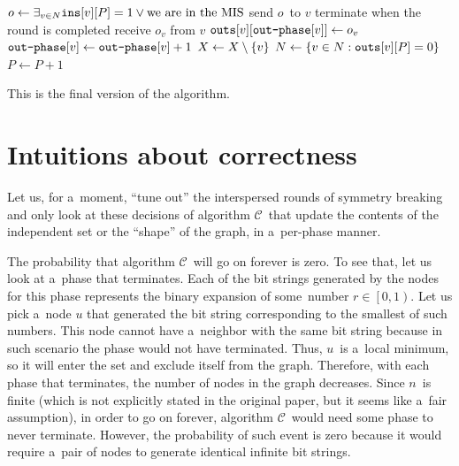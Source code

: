\documentclass{article}
\DeclarePairedDelimiter{\bracesdelimiter}{\{}{\}}
\def\braces{\bracesdelimiter*}
\let\set\braces
\DeclarePairedDelimiter{\bracketsdelimiter}{[}{]}
\def\brackets{\bracketsdelimiter*}
\begin{document}
\begin{algorithm}[H]
\begin{algorithmic}
    \State \(o \gets \exists_{v \in N}\texttt{ins}\brackets{v}\brackets{P} = 1 \lor \textrm{we are in the MIS}\)
        \State send \(o\)~to \(v\)
    \EndFor
        \State terminate when the round is completed
    \EndIf
\EndIf
{}
    \State receive \(o_v\) from \(v\)
        \State \(\texttt{outs}\brackets{v}\brackets{\texttt{out-phase}\brackets{v}} \gets o_v\)
        \State \(\texttt{out-phase}\brackets{v} \gets \texttt{out-phase}\brackets{v} + 1\)
            \State \(X \gets X \setminus \set{v}\) 
        \EndIf
    \EndIf
\EndFor
{}
\If{\(\forall_{v \in N}\texttt{outs}\brackets{v}\brackets{P} \neq \bot\)}
    \State \(N \gets \set{v \in N : \texttt{outs}\brackets{v}\brackets{P} = 0}\) 
    \State \(P \gets P + 1\)
\EndIf

\end{algorithmic}
\end{algorithm}

This is the final version of the algorithm.

\section{Intuitions about correctness}
Let us, for a~moment, ``tune out'' the interspersed rounds of symmetry breaking and only look at these decisions of algorithm \(\mathcal{C}\)~that update the contents of the independent set or the ``shape'' of the graph, in a~per-phase manner.

The probability that algorithm \(\mathcal{C}\)~will go on forever is zero. To see that, let us look at a~phase that terminates. Each of the bit strings generated by the nodes for this phase represents the binary expansion of some~number \(r \in \left[0, 1\right)\). Let us pick a~node \(u\) that generated the bit string corresponding to the smallest of such numbers. This node cannot have a~neighbor with the same bit string because in such scenario the phase would not have terminated. Thus, \(u\)~is a~local minimum, so it will enter the set and exclude itself from the graph. Therefore, with each phase that terminates, the number of nodes in the graph decreases. Since \(n\)~is finite (which is not explicitly stated in the original paper, but it seems like a~fair assumption), in order to go on forever, algorithm \(\mathcal{C}\)~would need some phase to never terminate. However, the probability of such event is zero because it would require a~pair of nodes to generate identical infinite bit strings. 
\end{document}
